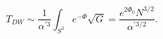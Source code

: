 \begin{equation}
T_{DW}\sim \frac{1}{\alpha^{'3}}\int_{S^3}e^{-\Phi}\sqrt{G}=\frac{e^{2\Phi_0}N^{3/2}}{\alpha^{'3/2}}.
\end{equation}

